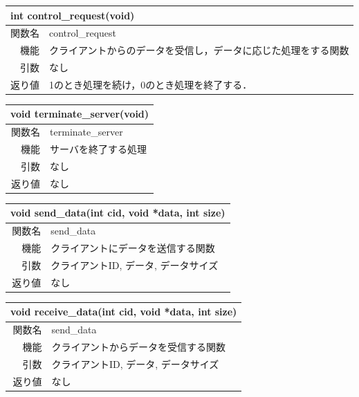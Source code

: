 \documentclass{jarticle}
\begin{document}
\begin{table}[H]
\begin{tabular}{|r|l|}
\hline
  \multicolumn{2}{|l|}{int control\_request(void)}       \\ \hline
関数名           & control\_request \\ \hline
機能     & クライアントからのデータを受信し，データに応じた処理をする関数 \\
引数     & なし \\
返り値   & 1のとき処理を続け，0のとき処理を終了する． \\ \hline
\end{tabular}
\end{table}


\begin{table}[H]
\begin{tabular}{|r|l|}
\hline
  \multicolumn{2}{|l|}{void terminate\_server(void)}       \\ \hline
関数名           & terminate\_server \\ \hline
機能     & サーバを終了する処理 \\
引数     & なし \\
返り値   & なし \\ \hline
\end{tabular}
\end{table}


\begin{table}[H]
\begin{tabular}{|r|l|}
\hline
  \multicolumn{2}{|l|}{void send\_data(int cid, void *data, int size)}       \\ \hline
関数名           & send\_data \\ \hline
機能     & クライアントにデータを送信する関数 \\
引数     & クライアントID, データ, データサイズ \\
返り値   & なし \\ \hline
\end{tabular}
\end{table}

\begin{table}[H]
\begin{tabular}{|r|l|}
\hline
  \multicolumn{2}{|l|}{void receive\_data(int cid, void *data, int size)}       \\ \hline
関数名           & send\_data \\ \hline
機能     & クライアントからデータを受信する関数 \\
引数     & クライアントID, データ, データサイズ \\
返り値   & なし \\ \hline
\end{tabular}
\end{table}
\end{document}
